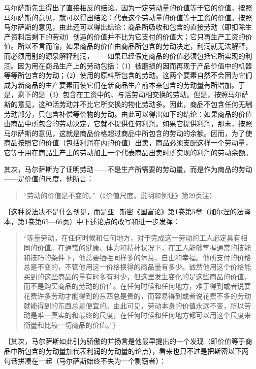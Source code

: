 马尔萨斯先生得出了直接相反的结论。因为一定劳动量的价值等于它的价值，按照马尔萨斯的意见，就可以得出结论：代表这个劳动量的价值等于工资的价值。按照马尔萨斯的意见，由此还可以得出结论：商品所吸收和包含的直接劳动（即扣除生产资料后剩下的劳动）创造的价值并不比为它支付的价值大；它只再生产工资的价值。所以不言而喻，如果商品的价值由商品所包含的劳动决定，利润就无法解释，而必须用别的源泉解释利润，——如果已经假定商品的价值必须包括它所实现的利润。因为用在商品生产上的劳动包括：（1）被磨损的因而再现于产品价值中的机器等等所包含的劳动；（2）使用的原料所包含的劳动。这两个要素自然不会因为它们成为新商品的生产要素而使它们在新商品生产前本来包含的劳动量有所增加。于是，剩下的是（3）包含在工资中的、与活劳动相交换的劳动。但是，按照马尔萨斯的意见，这种活劳动并不比它所交换的物化劳动多。因此，商品不包含任何无酬劳动部分，只包含补偿等价物的劳动。由此可以得出如下的结论：如果商品的价值由商品中所包含的劳动决定，它就不提供任何利润。如果它提供利润，那末，按照马尔萨斯的意见，这就是商品价格超过商品中所包含的劳动的余额。因而，为了使商品按照它的价值（包括利润在内的价值）出卖，商品必须支配这样一个劳动量，它等于用在商品生产上的劳动加上一个代表商品出卖时所实现的利润的劳动余额。


其次，马尔萨斯为了证明劳动——不是生产所需要的劳动量，而是作为商品的劳动——是价值的尺度，他断言：

\begin{quote}{“劳动的价值是不变的。”（《价值尺度。说明和例证》第29页注）}\end{quote}

｛这种说法决不是什么创见，而是亚·斯密《国富论》第1卷第5章（加尔涅的法译本，第1卷第65—66页）中下述论点的改写和进一步发挥：

\begin{quote}{“等量劳动，在任何时候和任何地方，对于完成这一劳动的工人必定具有相同的价值。在通常的健康、体力和精神状况下，在工人能够掌握通常的技能和技巧的条件下，他总要牺牲同样多的休息、自由和幸福。他所支付的价格总是不变的，不管他用这一价格换得的商品量有多少。诚然他用这个价格能买到的这些商品的量有时多有时少，但这里发生变化的是这些商品的价值，而不是购买商品的劳动的价值。在任何时候和任何地方，难于得到或者说要花费许多劳动才能得到的东西总是贵的，而容易得到或者说花费不多的劳动就能得到的东西总是便宜的。由此可见，劳动本身的价值永远不变，所以劳动是唯一真实的和最终的尺度，在任何时候和任何地方都可以用这个尺度来衡量和比较一切商品的价值。”｝}\end{quote}

｛其次，马尔萨斯如此引为骄傲的并扬言是他最早提出的一个发现（即价值等于商品中所包含的劳动量加代表利润的劳动量的论点），看来也只不过是把斯密以下两句话拼凑在一起（马尔萨斯始终不失为一个剽窃者）：

